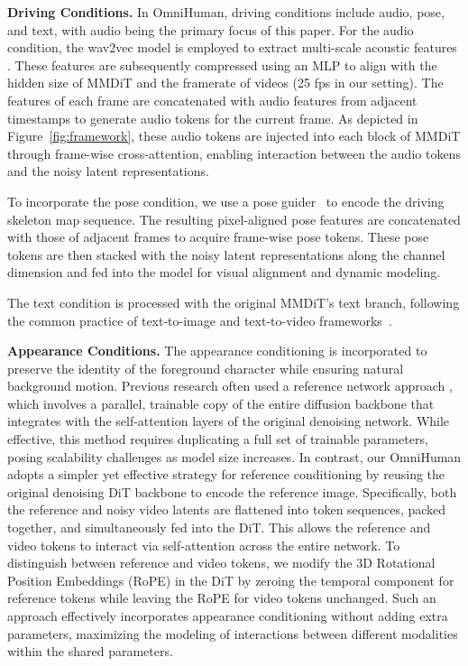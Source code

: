 \textbf{Driving Conditions.} In OmniHuman, driving conditions include audio, pose, and text, with audio being the primary focus of this paper. For the audio condition, the wav2vec  model \cite{schneider2019wav2vec,baevski2020wav2vec2} is employed to extract multi-scale acoustic features \cite{jiang2024loopy, tian2024emo}. These features are subsequently compressed using an MLP to align with the hidden size of MMDiT and the framerate of videos (25 fps in our setting). The features of each frame are concatenated with audio features from adjacent timestamps to generate audio tokens for the current frame. As depicted in Figure~\ref{fig:framework}, these audio tokens are injected into each block of MMDiT through frame-wise cross-attention, enabling interaction between the audio tokens and the noisy latent representations. 

To incorporate the pose condition, we use a pose guider~\cite{aa} to encode the driving skeleton map sequence. The resulting pixel-aligned pose features are concatenated with those of adjacent frames to acquire frame-wise pose tokens. These pose tokens are then stacked with the noisy latent representations along the channel dimension and fed into the model for visual alignment and dynamic modeling. 

The text condition is processed with the original MMDiT's text branch, following the common practice of text-to-image and text-to-video frameworks~\cite{sd3,dit}.

\textbf{Appearance Conditions.} The appearance conditioning is incorporated to preserve the identity of the foreground character while ensuring natural background motion. Previous research often used a reference network approach \cite{jiang2024loopy,lin2025cyberhost,tian2024emo}, which involves a parallel, trainable copy of the entire diffusion backbone that integrates with the self-attention layers of the original denoising network. While effective, this method requires duplicating a full set of trainable parameters, posing scalability challenges as model size increases. 
In contrast, our OmniHuman adopts a simpler yet effective strategy for reference conditioning by reusing the original denoising DiT backbone to encode the reference image. Specifically, both the reference and noisy video latents are flattened into token sequences, packed together, and simultaneously fed into the DiT. This allows the reference and video tokens to interact via self-attention across the entire network. To distinguish between reference and video tokens, we modify the 3D Rotational Position Embeddings (RoPE) \cite{rope} in the DiT by zeroing the temporal component for reference tokens while leaving the RoPE for video tokens unchanged. Such an approach effectively incorporates appearance conditioning without adding extra parameters, maximizing the modeling of interactions between different modalities within the shared parameters. 

